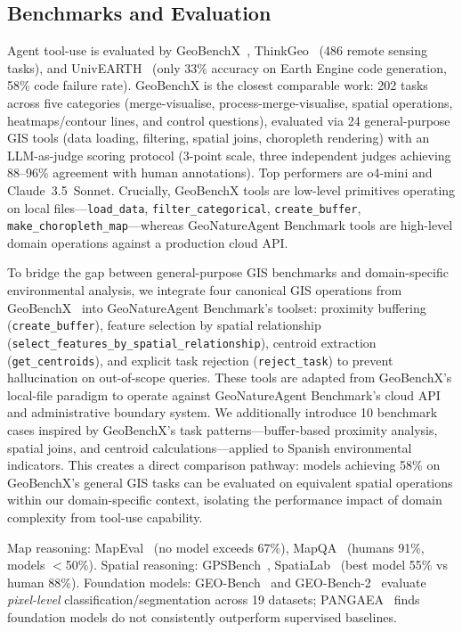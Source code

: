\documentclass[10pt,twocolumn]{article}
\begin{document}
\subsection{Benchmarks and Evaluation}

Agent tool-use is evaluated by GeoBenchX~\citep{krechetova2025geobenchx}, ThinkGeo~\citep{shabbir2025thinkgeo} (486 remote sensing tasks), and UnivEARTH~\citep{kao2025univearth} (only 33\% accuracy on Earth Engine code generation, 58\% code failure rate). GeoBenchX is the closest comparable work: 202 tasks across five categories (merge-visualise, process-merge-visualise, spatial operations, heatmaps/contour lines, and control questions), evaluated via 24 general-purpose GIS tools (data loading, filtering, spatial joins, choropleth rendering) with an LLM-as-judge scoring protocol (3-point scale, three independent judges achieving 88--96\% agreement with human annotations). Top performers are o4-mini and Claude~3.5~Sonnet. Crucially, GeoBenchX tools are low-level primitives operating on local files---\texttt{load\_data}, \texttt{filter\_categorical}, \texttt{create\_buffer}, \texttt{make\_choropleth\_map}---whereas GeoNatureAgent Benchmark tools are high-level domain operations against a production cloud API.

To bridge the gap between general-purpose GIS benchmarks and domain-specific environmental analysis, we integrate four canonical GIS operations from GeoBenchX~\citep{krechetova2025geobenchx} into GeoNatureAgent Benchmark's toolset: proximity buffering (\texttt{create\_buffer}), feature selection by spatial relationship (\texttt{select\_features\_by\_spatial\_relationship}), centroid extraction (\texttt{get\_centroids}), and explicit task rejection (\texttt{reject\_task}) to prevent hallucination on out-of-scope queries. These tools are adapted from GeoBenchX's local-file paradigm to operate against GeoNatureAgent Benchmark's cloud API and administrative boundary system. We additionally introduce 10 benchmark cases inspired by GeoBenchX's task patterns---buffer-based proximity analysis, spatial joins, and centroid calculations---applied to Spanish environmental indicators. This creates a direct comparison pathway: models achieving 58\% on GeoBenchX's general GIS tasks can be evaluated on equivalent spatial operations within our domain-specific context, isolating the performance impact of domain complexity from tool-use capability.

Map reasoning: MapEval~\citep{dihan2025mapeval} (no model exceeds 67\%), MapQA~\citep{arnold2025mapqa} (humans 91\%, models $<$50\%). Spatial reasoning: GPSBench~\citep{truong2026gpsbench}, SpatiaLab~\citep{wasi2026spatialab} (best model 55\% vs human 88\%). Foundation models: GEO-Bench~\citep{lacoste2023geobench} and GEO-Bench-2~\citep{simumba2025geobench2} evaluate \emph{pixel-level} classification/segmentation across 19 datasets; PANGAEA~\citep{marsocci2024pangaea} finds foundation models do not consistently outperform supervised baselines.
\end{document}
